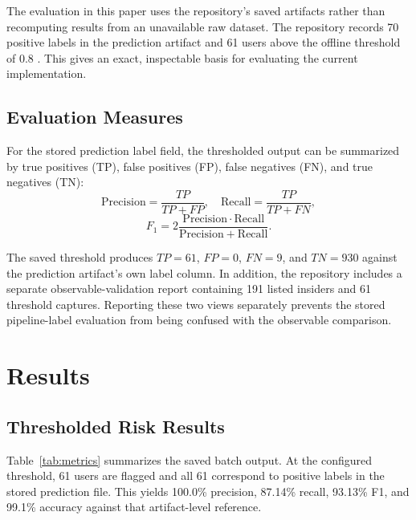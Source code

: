 The evaluation in this paper uses the repository's saved artifacts rather than recomputing results from an unavailable raw dataset. The repository records 70 positive labels in the prediction artifact and 61 users above the offline threshold of 0.8 \cite{threattronrepo}. This gives an exact, inspectable basis for evaluating the current implementation.

\subsection{Evaluation Measures}
For the stored prediction label field, the thresholded output can be summarized by true positives (TP), false positives (FP), false negatives (FN), and true negatives (TN):
\begin{equation}
\mathrm{Precision}=\frac{TP}{TP+FP},\quad
\mathrm{Recall}=\frac{TP}{TP+FN},
\end{equation}
\begin{equation}
F_1=2\frac{\mathrm{Precision}\cdot\mathrm{Recall}}
{\mathrm{Precision}+\mathrm{Recall}}.
\end{equation}

The saved threshold produces $TP=61$, $FP=0$, $FN=9$, and $TN=930$ against the prediction artifact's own label column. In addition, the repository includes a separate observable-validation report containing 191 listed insiders and 61 threshold captures. Reporting these two views separately prevents the stored pipeline-label evaluation from being confused with the observable comparison.

\section{Results}
\subsection{Thresholded Risk Results}
Table~\ref{tab:metrics} summarizes the saved batch output. At the configured threshold, 61 users are flagged and all 61 correspond to positive labels in the stored prediction file. This yields 100.0\% precision, 87.14\% recall, 93.13\% F1, and 99.1\% accuracy against that artifact-level reference.

